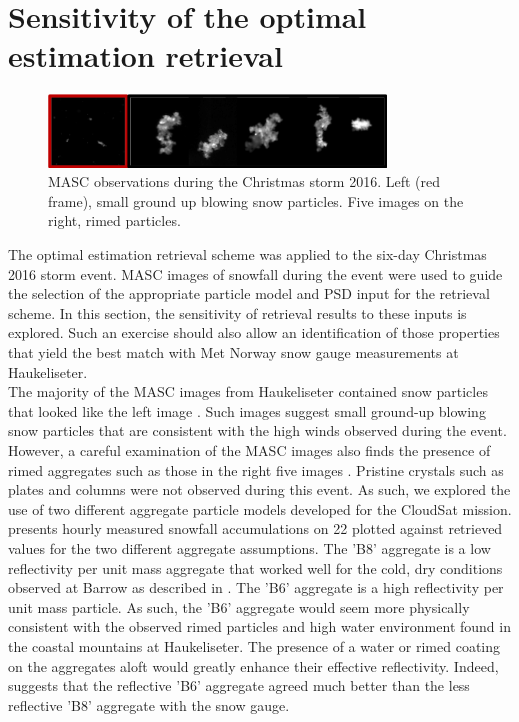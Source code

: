 \section{Sensitivity of the optimal estimation retrieval}\label{sec:ret:sensitivity}
\begin{figure}[h]
	\centering
	\includegraphics[width=0.8\textwidth]{./MASC_obs/blow_part}
	\caption{MASC observations during the Christmas storm 2016. Left (red frame), small ground up blowing snow particles. Five images on the right, rimed particles.}\label{fig:ret:all_part}
\end{figure}
\noindent
The optimal estimation retrieval scheme was applied to the six-day Christmas 2016 storm event.  MASC images of snowfall during the event were used to guide the selection of the appropriate particle model and PSD input for the retrieval scheme. In this section, the sensitivity of retrieval results to these inputs is explored. Such an exercise should also allow an identification of those properties that yield the best match with Met Norway snow gauge measurements at Haukeliseter.  
\\
The majority of the MASC images from Haukeliseter contained snow particles that looked like the left image . Such images suggest small ground-up blowing snow particles that are consistent with the high winds observed during the event.  However, a careful examination of the MASC images also finds the presence of rimed aggregates such as those in the right five images . Pristine crystals such as plates and columns were not observed during this event.  As such, we explored the use of two different aggregate particle models developed for the CloudSat mission. 
\\
 presents hourly measured snowfall accumulations on \SI{22}{\dec} plotted against retrieved values for the two different aggregate assumptions. The 'B8' aggregate is a low reflectivity per unit mass aggregate that worked well for the cold, dry conditions observed at Barrow as described in \citet{cooper_variational_2017}.  The 'B6' aggregate is a high reflectivity per unit mass particle.  As such, the 'B6' aggregate would seem more physically consistent with the observed rimed particles and high water environment found in the coastal mountains at Haukeliseter.  The presence of a water or rimed coating on the aggregates aloft would greatly enhance their effective reflectivity. Indeed,  suggests that the reflective 'B6' aggregate agreed much better than the less reflective 'B8' aggregate with the snow gauge.
